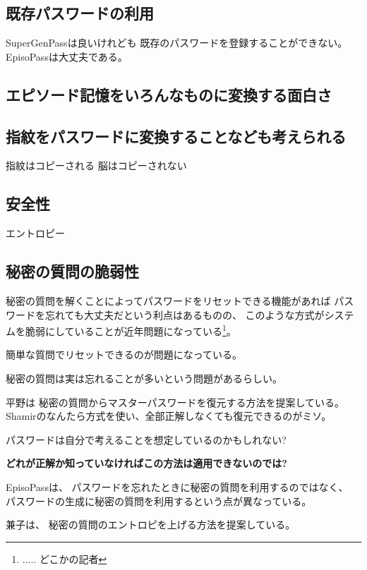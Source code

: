 \documentclass[twoside]{wiss}
\begin{document}
\subsection{既存パスワードの利用}

SuperGenPass\cite{SuperGenPass}は良いけれども
既存のパスワードを登録することができない。
EpisoPassは大丈夫である。

\subsection{エピソード記憶をいろんなものに変換する面白さ}

\subsection{指紋をパスワードに変換することなども考えられる}

指紋はコピーされる
脳はコピーされない

\subsection{安全性}

エントロピー

\subsection{秘密の質問の脆弱性}

秘密の質問を解くことによってパスワードをリセットできる機能があれば
パスワードを忘れても大丈夫だという利点はあるものの、
このような方式がシステムを脆弱にしていることが近年問題になっている\footnote{
  ..... どこかの記者
}。

簡単な質問でリセットできるのが問題になっている。

秘密の質問は実は忘れることが多いという問題があるらしい。

平野\cite{平野亮:2011-11-07}は
秘密の質問からマスターパスワードを復元する方法を提案している。
Shamirのなんたら方式を使い、全部正解しなくても復元できるのがミソ。

パスワードは自分で考えることを想定しているのかもしれない?

\textbf{どれが正解か知っていなければこの方法は適用できないのでは?}


EpisoPassは、
パスワードを忘れたときに秘密の質問を利用するのではなく、
パスワードの生成に秘密の質問を利用するという点が異なっている。

兼子は、
秘密の質問のエントロピを上げる方法を提案している\cite{Kaneko}。
\end{document}
